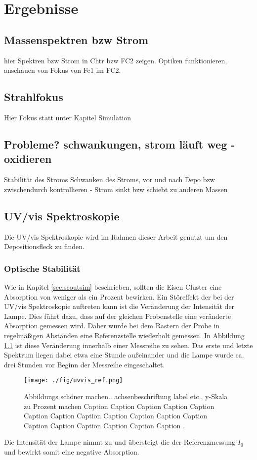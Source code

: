 \chapter{Ergebnisse}
\section{Massenspektren bzw Strom}
hier Spektren bzw Strom in Chtr bzw FC2 zeigen. Optiken funktionieren, anschauen von Fokus von Fe1 im FC2.
\section{Strahlfokus}
Hier Fokus statt unter Kapitel Simulation
\section{Probleme? schwankungen, strom läuft weg - oxidieren}
Stabilität des Stroms
Schwanken des Stroms, vor und nach Depo bzw zwischendurch kontrollieren - Strom sinkt bzw schiebt zu anderen Massen
\section{UV/vis Spektroskopie}
Die UV/vis Spektroskopie wird im Rahmen dieser Arbeit genutzt um den Depositionsfleck zu finden. 


\subsection{Optische Stabilität}
Wie in Kapitel \ref{sec:scoutsim} beschrieben, sollten die Eisen Cluster eine Absorption von weniger als ein Prozent bewirken.
Ein Störeffekt der bei der UV/vis Spektroskopie auftreten kann ist die Veränderung der Intensität der Lampe. 
Dies führt dazu, dass auf der gleichen Probenstelle eine veränderte Absorption gemessen wird.
Daher wurde bei dem Rastern der Probe in regelmäßigen Abständen eine Referenzstelle wiederholt gemessen.
In Abbildung \ref{fig:uvvis_ref} ist diese Veränderung innerhalb einer Messreihe zu sehen.
Das erste und letzte Spektrum liegen dabei etwa eine Stunde außeinander und die Lampe wurde ca. drei Stunden vor Beginn der Messreihe eingeschaltet. \\
\begin{figure}
    \centering
    \texttt{[image: ./fig/uvvis\_ref.png]}
    \caption{Abbildungs schöner machen.. achsenbeschriftung label etc., y-Skala zu Prozent machen Caption Caption Caption Caption Caption Caption Caption Caption Caption Caption Caption Caption Caption Caption Caption Caption Caption Caption .}
    \label{fig:uvvis_ref}
\end{figure}
Die Intensität der Lampe nimmt zu und übersteigt die der Referenzmessung $I_0$ und bewirkt somit eine negative Absorption. 

